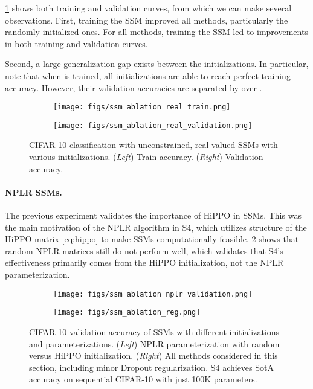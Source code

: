 \documentclass{article}
\begin{document}
\cref{fig:ssm-ablation-real} shows both training and validation curves, from which we can make several observations.
First, training the SSM improved all methods, particularly the randomly initialized ones.
For all methods, training the SSM led to improvements in both training and validation curves.

Second, a large generalization gap exists between the initializations.
In particular, note that when  is trained, all initializations are able to reach perfect training accuracy.
However, their validation accuracies are separated by over .

\begin{figure}[!ht]
\begin{subfigure}{.5\linewidth}\centering
    \texttt{[image: figs/ssm\_ablation\_real\_train.png]}
\end{subfigure}
\begin{subfigure}{.5\linewidth}\centering
    \texttt{[image: figs/ssm\_ablation\_real\_validation.png]}
\end{subfigure}
\caption{CIFAR-10 classification with unconstrained, real-valued SSMs with various initializations. (\emph{Left}) Train accuracy. (\emph{Right}) Validation accuracy.}
\label{fig:ssm-ablation-real}
\end{figure}

\paragraph{NPLR SSMs.}
The previous experiment validates the importance of HiPPO in SSMs.
This was the main motivation of the NPLR algorithm in S4,
which utilizes structure of the HiPPO matrix \eqref{eq:hippo} to make SSMs computationally feasible.
\cref{fig:ssm-ablation-nplr} shows that random NPLR matrices still do not perform well,
which validates that S4's effectiveness primarily comes from the HiPPO initialization, not the NPLR parameterization.

\begin{figure}[!t]
\begin{subfigure}{.5\linewidth}\centering
    \texttt{[image: figs/ssm\_ablation\_nplr\_validation.png]}
    \caption{}
    \label{fig:ssm-ablation-nplr}
\end{subfigure}
\begin{subfigure}{.5\linewidth}\centering
    \texttt{[image: figs/ssm\_ablation\_reg.png]}
    \caption{}
    \label{fig:ssm-ablation-reg}
\end{subfigure}
\caption{
  CIFAR-10 validation accuracy of SSMs with different initializations and parameterizations.
  (\emph{Left}) NPLR parameterization with random versus HiPPO initialization.
  (\emph{Right}) All methods considered in this section, including minor Dropout regularization. S4 achieves SotA accuracy on sequential CIFAR-10 with just 100K parameters.
}
\end{figure}
\end{document}
